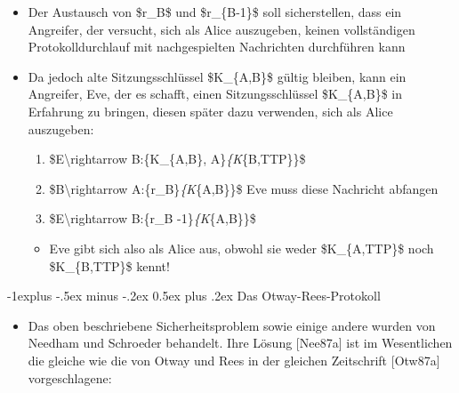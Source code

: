 \documentclass[a4paper]{article}
\makeatletter
\renewcommand{\subsection}{\@startsection{subsection}{2}{0mm}%
 {-1explus -.5ex minus -.2ex}%
 {0.5ex plus .2ex}%
 {\normalfont\normalsize\bfseries}}
\makeatother
\begin{document}
\begin{multicols}{3}
\begin{itemize}
              \begin{itemize}
                  \item
                        Der Austausch von \$r\_B\$ und \$r\_\{B-1\}\$ soll sicherstellen,
                        dass ein Angreifer, der versucht, sich als Alice auszugeben, keinen
                        vollständigen Protokolldurchlauf mit nachgespielten Nachrichten
                        durchführen kann
                  \item
                        Da jedoch alte Sitzungsschlüssel \$K\_\{A,B\}\$ gültig bleiben, kann
                        ein Angreifer, Eve, der es schafft, einen Sitzungsschlüssel
                        \$K\_\{A,B\}\$ in Erfahrung zu bringen, diesen später dazu
                        verwenden, sich als Alice auszugeben:

                        \begin{enumerate}
                            \def\labelenumi{\arabic{enumi}.}
                            \item
                                  \$E\textbackslash rightarrow B:\{K\_\{A,B\},
                                  A\}\emph{\{K}\{B,TTP\}\}\$
                            \item
                                  \$B\textbackslash rightarrow A:\{r\_B\}\emph{\{K}\{A,B\}\}\$ Eve
                                  muss diese Nachricht abfangen
                            \item
                                  \$E\textbackslash rightarrow B:\{r\_B -1\}\emph{\{K}\{A,B\}\}\$
                        \end{enumerate}

                        \begin{itemize}
                            \item
                                  Eve gibt sich also als Alice aus, obwohl sie weder
                                  \$K\_\{A,TTP\}\$ noch \$K\_\{B,TTP\}\$ kennt!
                        \end{itemize}
              \end{itemize}
    \end{itemize}


    \subsection{Das Otway-Rees-Protokoll}

    \begin{itemize}
        \item
              Das oben beschriebene Sicherheitsproblem sowie einige andere wurden
              von Needham und Schroeder behandelt. Ihre Lösung {[}Nee87a{]} ist im
              Wesentlichen die gleiche wie die von Otway und Rees in der gleichen
              Zeitschrift {[}Otw87a{]} vorgeschlagene:


\end{itemize}
\end{multicols}
\end{document}
